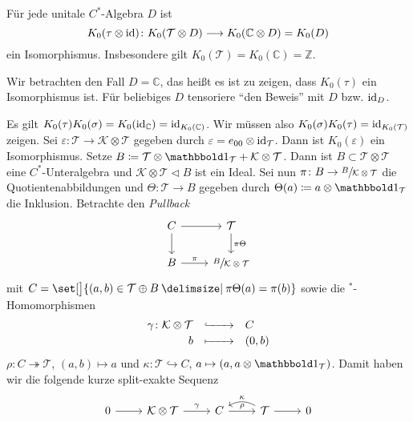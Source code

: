 \begin{satz}[name={Cuntz},label=satz:95]
	Für jede unitale $C^*$-Algebra $D$ ist 
	\[
		K_0(\tau \otimes {\id}) \colon  K_0 \enbrace*{\mathcal{T} \otimes D} \longrightarrow K_0(\mathbb{C} \otimes D) = K_0(D)
	\]
	ein Isomorphismus. Insbesondere gilt $K_0(\mathcal{T})=K_0(\mathbb{C}) = \mathbb{Z}$.
\end{satz}
\begin{beweis}
	Wir betrachten den Fall $D=\mathbb{C}$, das heißt es ist zu zeigen, dass $K_0(\tau)$ ein Isomorphismus ist.
	Für beliebiges $D$ tensoriere \enquote{den Beweis} mit $D$ bzw. $\operatorname{id}_D$.
	
	Es gilt $K_0(\tau) K_0(\sigma) = K_0({\operatorname{id}_\mathbb{C}}) = {\operatorname{id}_{K_0(\mathbb{C})}}$.
	Wir müssen also $K_0(\sigma) K_0(\tau) = {\operatorname{id}_{K_0(\mathcal{T})}}$ zeigen.
	Sei $\varepsilon \colon \mathcal{T} \to \mathcal{K} \otimes \mathcal{T}$ gegeben durch $\varepsilon = e_{00} \otimes {\operatorname{id}_{\mathcal{T}}}$.
	Dann ist $K_0(\varepsilon)$ ein Isomorphismus.
	Setze $B \coloneqq \mathcal{T} \otimes \ind_{\mathcal{T}} + \mathcal{K} \otimes \mathcal{T}$.
	Dann ist $B \subset \mathcal{T} \otimes \mathcal{T}$ eine $C^*$-Unteralgebra und $\mathcal{K} \otimes \mathcal{T} \lhd B$ ist ein Ideal.
	Sei nun $\pi \colon B \to \sfrac{B}{\mathcal{K} \otimes \mathcal{T}}$ die Quotientenabbildungen und $\Theta \colon \mathcal{T} \to B$ gegeben durch $\Theta(a) \coloneqq a \otimes \ind_{\mathcal{T}}$ die Inklusion.
	Betrachte den \emph{Pullback}
	\[
		\begin{tikzcd}
			C \dar \rar & \mathcal{T} \dar["\pi \Theta"] \\
			B \rar["\pi"] & \sfrac{B}{\mathcal{K} \otimes \mathcal{T}}
		\end{tikzcd}
	\]
	mit $C= \set[\big]{(a,b) \in \mathcal{T} \oplus B \given \pi \Theta(a)= \pi(b)}$ sowie die $^*$-Homomorphismen 
	\[
		\begin{array}{rcl}
			\textstyle \gamma \colon \mathcal{K} \otimes \mathcal{T} &\xhookrightarrow{\minwidthbox{}{2em}} & \textstyle C \\[0.5ex]
			\textstyle b &\xmapsto{\minwidthbox{\mbox{ }}{2em}} & \textstyle (0,b)
		\end{array}
	\]
	$\rho \colon C \twoheadrightarrow \mathcal{T}$, $(a,b) \mapsto a$ und $\kappa \colon \mathcal{T} \hookrightarrow C$, $a \mapsto (a, a \otimes \ind_\mathcal{T})$.
	Damit haben wir die folgende kurze split-exakte Sequenz
	\[
		\begin{tikzcd}
			0 \rar & \mathcal{K} \otimes \mathcal{T} \rar["\gamma"] & C \rar["\rho"] & \mathcal{T} \lar[bend right,"\kappa"'] \rar & 0

\end{tikzcd}\]
\end{beweis}
